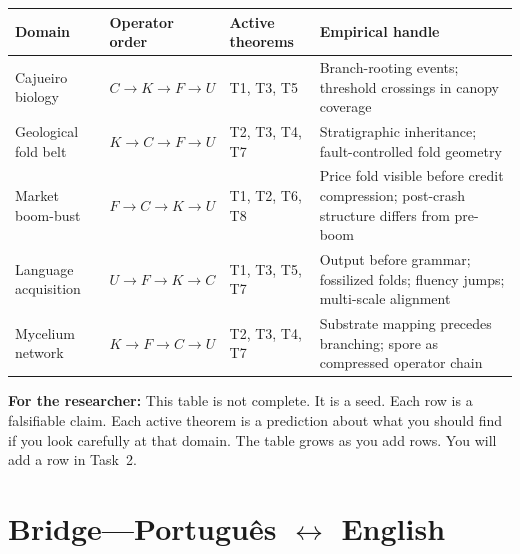 \documentclass[11pt, twoside, openright]{book}
\theoremstyle{plain}
\theoremstyle{definition}
\newenvironment{notebox}[1][]{%
  \begin{mdframed}[backgroundcolor=SeedBox!50,linecolor=PrincipiaSlate,linewidth=0.5pt,innertopmargin=6pt,innerbottommargin=6pt]
  \ifx\relax#1\relax\else\noindent\textbf{#1}\par\medskip\fi}{\end{mdframed}}
\begin{document}
\begin{tabularx}{\textwidth}{@{}P{1.8cm}P{2.2cm}P{1.8cm}L@{}}
\toprule
\textbf{Domain} & \textbf{Operator order} & \textbf{Active theorems} &
\textbf{Empirical handle} \\
\midrule
Cajueiro biology &
  $C \to K \to F \to U$ & T1, T3, T5 &
  Branch-rooting events; threshold crossings in canopy coverage \\[4pt]
Geological fold belt &
  $K \to C \to F \to U$ & T2, T3, T4, T7 &
  Stratigraphic inheritance; fault-controlled fold geometry \\[4pt]
Market boom-bust &
  $F \to C \to K \to U$ & T1, T2, T6, T8 &
  Price fold visible before credit compression; post-crash structure
  differs from pre-boom \\[4pt]
Language acquisition &
  $U \to F \to K \to C$ & T1, T3, T5, T7 &
  Output before grammar; fossilized folds; fluency jumps;
  multi-scale alignment \\[4pt]
Mycelium network &
  $K \to F \to C \to U$ & T2, T3, T4, T7 &
  Substrate mapping precedes branching; spore as compressed
  operator chain \\
\bottomrule
\end{tabularx}

\begin{notebox}
\textbf{For the researcher:} This table is not complete. It is a seed. Each row
is a falsifiable claim. Each active theorem is a prediction about what
you should find if you look carefully at that domain. The table grows
as you add rows. You will add a row in Task~2.
\end{notebox}

\section{Bridge---Portugu\^{e}s $\leftrightarrow$ English}
\end{document}
